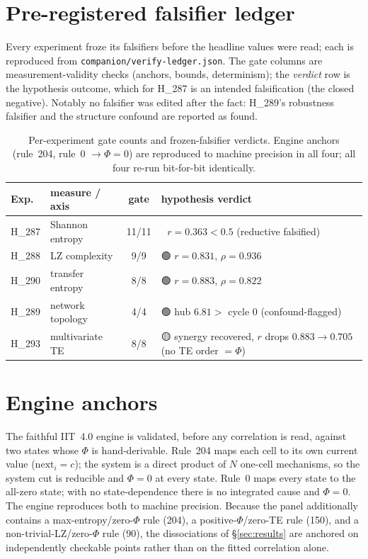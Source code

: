 \documentclass[11pt,a4paper]{article}
\providecommand{\tierGreen}{🟢}
\providecommand{\tierYellow}{🟡}
\providecommand{\tierRed}{🔴}
\newcommand{\bigphi}{\ensuremath{\Phi}}
\begin{document}
\appendix

\section{Pre-registered falsifier ledger}
\label{app:falsifiers}

Every experiment froze its falsifiers before the headline values were
read; each is reproduced from \texttt{companion/verify-ledger.json}. The
gate columns are measurement-validity checks (anchors, bounds,
determinism); the \emph{verdict} row is the hypothesis outcome, which for
H\_287 is an intended falsification (the closed negative). Notably no
falsifier was edited after the fact: H\_289's robustness falsifier and the
structure confound are reported as found.

\begin{table}[h]
\centering
\small
\begin{tabular}{llcl}
\toprule
\textbf{Exp.} & \textbf{measure / axis} & \textbf{gate} & \textbf{hypothesis verdict} \\
\midrule
H\_287 & Shannon entropy   & 11/11 & \tierRed{} \(r=0.363<0.5\) (reductive falsified) \\
H\_288 & LZ complexity     & 9/9   & \tierGreen{} \(r=0.831\), \(\rho=0.936\) \\
H\_290 & transfer entropy  & 8/8   & \tierGreen{} \(r=0.883\), \(\rho=0.822\) \\
H\_289 & network topology  & 4/4   & \tierGreen{} hub \(6.81>\) cycle \(0\) (confound-flagged) \\
H\_293 & multivariate TE   & 8/8   & \tierYellow{} synergy recovered, \(r\) drops \(0.883\!\to\!0.705\) (no TE order \(=\bigphi\)) \\
\bottomrule
\end{tabular}
\caption{Per-experiment gate counts and frozen-falsifier verdicts. Engine
anchors (rule~204, rule~0 \(\to\bigphi{=}0\)) are reproduced to machine
precision in all four; all four re-run bit-for-bit identically.}
\label{tab:falsifiers}
\end{table}

\section{Engine anchors}
\label{app:anchors}

The faithful IIT~4.0 engine is validated, before any correlation is read,
against two states whose \bigphi{} is hand-derivable. Rule~204 maps each
cell to its own current value (\(\mathrm{next}_i=c\)); the system is a
direct product of \(N\) one-cell mechanisms, so the system cut is
reducible and \(\bigphi=0\) at every state. Rule~0 maps every state to the
all-zero state; with no state-dependence there is no integrated cause and
\(\bigphi=0\). The engine reproduces both to machine precision. Because
the panel additionally contains a max-entropy/zero-\bigphi{} rule (204),
a positive-\bigphi{}/zero-TE rule (150), and a non-trivial-LZ/zero-\bigphi{}
rule (90), the dissociations of \S\ref{sec:results} are anchored on
independently checkable points rather than on the fitted correlation
alone.



\end{document}
